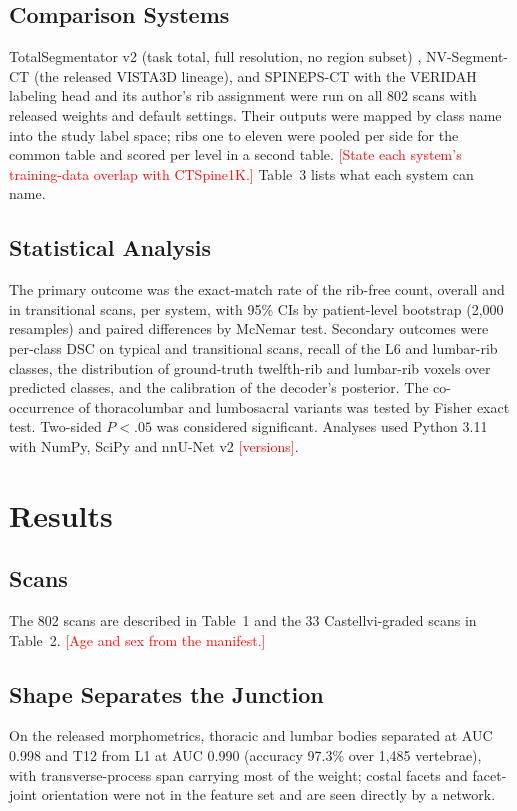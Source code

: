 \documentclass[12pt]{article}
\newcommand{\todo}[1]{\textcolor{red}{[#1]}}
\begin{document}
\subsection*{Comparison Systems}
TotalSegmentator v2 (task total, full resolution, no region subset) \citep{Wasserthal2023TotalSegmentator:Images}, NV-Segment-CT (the released VISTA3D lineage), and SPINEPS-CT with the VERIDAH labeling head and its author's rib assignment \citep{Moller2024SPINEPSautomaticSegmentation,Moller2026VERIDAH:Sequences,Moller2025StumpRib} were run on all 802 scans with released weights and default settings. Their outputs were mapped by class name into the study label space; ribs one to eleven were pooled per side for the common table and scored per level in a second table. \todo{State each system's training-data overlap with CTSpine1K.} Table~3 lists what each system can name.

\subsection*{Statistical Analysis}
The primary outcome was the exact-match rate of the rib-free count, overall and in transitional scans, per system, with 95\% CIs by patient-level bootstrap (2,000 resamples) and paired differences by McNemar test. Secondary outcomes were per-class DSC on typical and transitional scans, recall of the L6 and lumbar-rib classes, the distribution of ground-truth twelfth-rib and lumbar-rib voxels over predicted classes, and the calibration of the decoder's posterior. The co-occurrence of thoracolumbar and lumbosacral variants was tested by Fisher exact test. Two-sided $P < .05$ was considered significant. Analyses used Python 3.11 with NumPy, SciPy and nnU-Net v2 \todo{versions}.

\section{Results}
\subsection*{Scans}
The 802 scans are described in Table~1 and the 33 Castellvi-graded scans in Table~2. \todo{Age and sex from the manifest.}

\subsection*{Shape Separates the Junction}
On the released morphometrics, thoracic and lumbar bodies separated at AUC 0.998 and T12 from L1 at AUC 0.990 (accuracy 97.3\% over 1,485 vertebrae), with transverse-process span carrying most of the weight; costal facets and facet-joint orientation were not in the feature set and are seen directly by a network.
\end{document}
